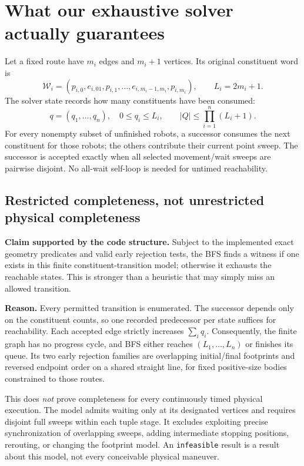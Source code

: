 \documentclass[11pt,a4paper]{article}
\begin{document}
\section{What our exhaustive solver actually guarantees}
Let a fixed route have $m_i$ edges and $m_i+1$ vertices. Its original constituent
word is
\begin{equation}
\mathcal W_i=(p_{i,0},e_{i,01},p_{i,1},\ldots,e_{i,m_i-1,m_i},p_{i,m_i}),
\qquad L_i=2m_i+1.
\end{equation}
The solver state records how many constituents have been consumed:
\begin{equation}
q=(q_1,\ldots,q_n),\quad 0\le q_i\le L_i,\qquad
|Q|\le\prod_{i=1}^n(L_i+1).
\end{equation}
For every nonempty subset of unfinished robots, a successor consumes the next
constituent for those robots; the others contribute their current point sweep.
The successor is accepted exactly when all selected movement/wait sweeps are
pairwise disjoint. No all-wait self-loop is needed for untimed reachability.

\clearpage
\subsection{Restricted completeness, not unrestricted physical completeness}
\textbf{Claim supported by the code structure.} Subject to the implemented exact
geometry predicates and valid early rejection tests, the BFS finds a witness if
one exists in this finite constituent-transition model; otherwise it exhausts
the reachable states. This is stronger than a heuristic that may simply miss
an allowed transition.

\textbf{Reason.} Every permitted transition is enumerated. The successor depends
only on the constituent counts, so one recorded predecessor per state suffices
for reachability. Each accepted edge strictly increases $\sum_i q_i$.
Consequently, the finite graph has no progress cycle, and BFS either reaches
$(L_1,\ldots,L_n)$ or finishes its queue. Its two early rejection families are
overlapping initial/final footprints and reversed endpoint order on a shared
straight line, for fixed positive-size bodies constrained to those routes.

This does \emph{not} prove completeness for every continuously timed physical
execution. The model admits waiting only at its designated vertices and requires
disjoint full sweeps within each tuple stage. It excludes exploiting precise
synchronization of overlapping sweeps, adding intermediate stopping positions,
rerouting, or changing the footprint model. An \texttt{infeasible} result is a
result about this model, not every conceivable physical maneuver.
\end{document}
